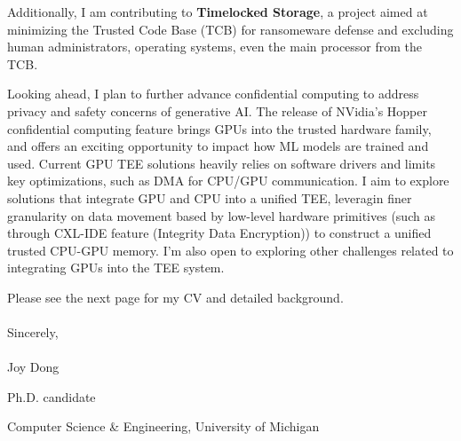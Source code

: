 Additionally, I am contributing to \textbf{Timelocked Storage}, a project aimed at minimizing the Trusted Code Base (TCB) for ransomeware defense and excluding human administrators, operating systems, even the main processor from the TCB. \par

\vspace{3ex}
Looking ahead, I plan to further advance confidential computing to address privacy and safety concerns of generative AI.  The release of NVidia's Hopper confidential computing feature brings GPUs into the trusted hardware family, and offers an exciting opportunity to impact how ML models are trained and used. Current GPU TEE solutions heavily relies on software drivers and limits key optimizations, such as DMA for CPU/GPU communication. I aim to explore solutions that integrate GPU and CPU into a unified TEE, leveragin finer granularity on data movement based by low-level hardware primitives (such as through CXL-IDE feature (Integrity Data Encryption)) to construct a unified trusted CPU-GPU memory. I'm also open to exploring other challenges related to integrating GPUs into the TEE system. \\

\vspace{3ex}

Please see the next page for my CV and detailed background. \\
\vspace{3ex}
\paragraph*{}
\:\: Sincerely, 
\paragraph*{}
\:\: Joy Dong \par
Ph.D. candidate\par
Computer Science \& Engineering, University of Michigan

